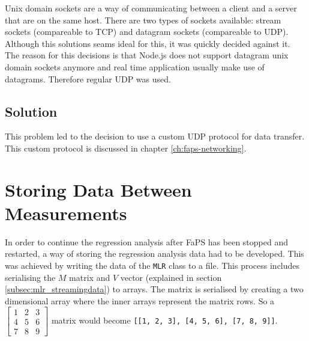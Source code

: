 Unix domain sockets are a way of communicating between a client and a server that are on the same host. There are two types of sockets available: stream sockets (compareable to TCP) and datagram sockets (compareable to
UDP). Although this solutions seams ideal for this, it was quickly decided against it. The reason for this decisions is that Node.js does not support datagram unix domain sockets anymore and real time application usually
make use of datagrams. Therefore regular UDP was used.

\subsection{Solution}

This problem led to the decision to use a custom UDP protocol for data transfer. This custom protocol is discussed in chapter \vref{ch:faps-networking}.

\section{Storing Data Between Measurements}

In order to continue the regression analysis after FaPS has been stopped and restarted, a way of storing the regression analysis data had to be developed. This was achieved by writing the data of the \lstinline{MLR} class to a file. This process includes serialising the $ M $ matrix and $ V $ vector (explained in section \vref{subsec:mlr_streamingdata}) to arrays. The matrix is serialised by creating a two dimensional array where the inner arrays represent the matrix rows. So a $ \begin{bmatrix} 1 & 2 & 3 \\ 4 & 5 & 6 \\ 7 & 8 & 9 \end{bmatrix} $ matrix would become \lstinline{[[1, 2, 3], [4, 5, 6], [7, 8, 9]]}.
